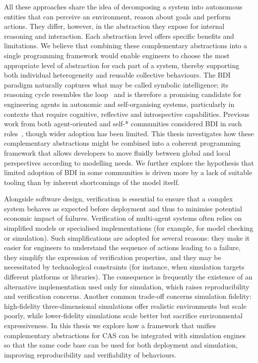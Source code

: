 \documentclass[12pt,a4paper,openright,twoside]{book}
\begin{document}
All these approaches share the idea of 
decomposing a system into autonomous entities that can perceive an environment, 
reason about goals 
and perform actions. 
%
They differ, however, 
in the abstraction they expose for internal reasoning and interaction. 
%
Each abstraction level offers specific benefits and limitations. 
%
We believe that combining these complementary abstractions into a single programming framework 
would enable engineers to choose the most appropriate level of abstraction 
for each part of a system, 
thereby supporting both individual heterogeneity and reusable collective behaviours.
%
The \ac{BDI} paradigm naturally captures what may be called symbolic intelligence; 
its reasoning cycle resembles the \mapek{} loop~\cite{DBLP:journals/computer/KephartC03} 
and is therefore a promising candidate for engineering agents in autonomic and self-organising systems, 
particularly in contexts that require cognitive, 
reflective and introspective capabilities. 
%
Previous work from both agent-oriented and self-* communities considered \ac{BDI} 
in such roles~\cite{DBLP:conf/saso/Burkhardt18,DBLP:conf/saso/CasadeiV18}, 
though wider adoption has been limited. 
%
This thesis investigates how these complementary abstractions 
might be combined into a coherent programming framework 
that allows developers to move fluidly between global and local perspectives according to modelling needs. 
%
We further explore the hypothesis that limited adoption of \ac{BDI} in some communities is driven more by a lack of suitable tooling than by inherent shortcomings of the model itself.

Alongside software design, 
verification is essential to ensure that a complex system behaves as expected before deployment 
and thus to minimise potential economic impact of failures. 
%
Verification of multi-agent systems often relies on simplified models or specialised implementations 
(for example, for model checking or simulation). 
%
Such simplifications are adopted for several reasons: 
they make it easier for engineers to understand the sequence of actions leading to a failure,
they simplify the expression of verification properties, 
and they may be necessitated by technological constraints 
(for instance, when simulation targets different platforms or libraries). 
%
The consequence is frequently the existence of an alternative implementation used only for simulation, 
which raises reproducibility and verification concerns.
%
Another common trade-off concerns simulation fidelity: 
high-fidelity three-dimensional simulations offer realistic environments but scale poorly,
while lower-fidelity simulations scale better but sacrifice environmental expressiveness. 
%
In this thesis we explore how a framework 
that unifies complementary abstractions for \ac{CAS} 
can be integrated with simulation engines so that the same code base can be used 
for both deployment and simulation, 
improving reproducibility and verifiability of behaviours.
\end{document}
